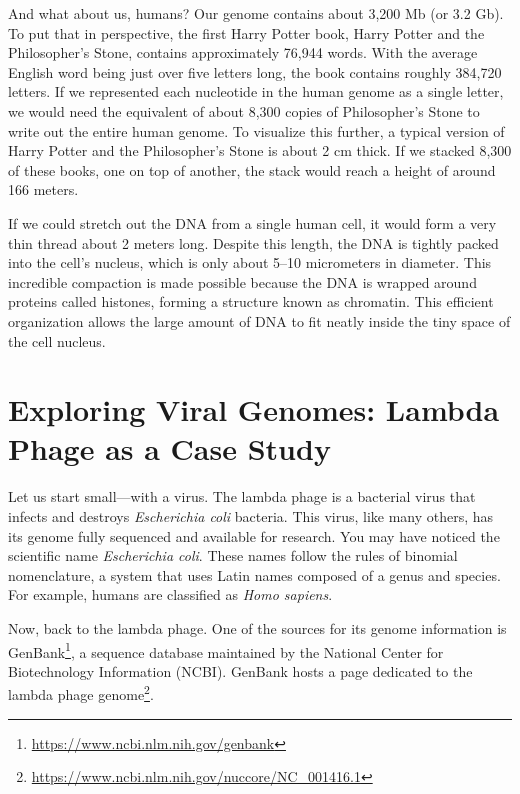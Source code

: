And what about us, humans? Our genome contains about 3,200 Mb (or 3.2 Gb). To put that in perspective, the first Harry Potter book, Harry Potter and the Philosopher’s Stone, contains approximately 76,944 words. With the average English word being just over five letters long, the book contains roughly 384,720 letters. If we represented each nucleotide in the human genome as a single letter, we would need the equivalent of about 8,300 copies of Philosopher’s Stone to write out the entire human genome. To visualize this further, a typical version of Harry Potter and the Philosopher’s Stone is about 2 cm thick. If we stacked 8,300 of these books, one on top of another, the stack would reach a height of around 166 meters.

If we could stretch out the DNA from a single human cell, it would form a very thin thread about 2 meters long. Despite this length, the DNA is tightly packed into the cell's nucleus, which is only about 5–10 micrometers in diameter. This incredible compaction is made possible because the DNA is wrapped around proteins called histones, forming a structure known as chromatin. This efficient organization allows the large amount of DNA to fit neatly inside the tiny space of the cell nucleus.

\section{Exploring Viral Genomes: Lambda Phage as a Case Study}

Let us start small—with a virus. The lambda phage is a bacterial virus that infects and destroys \textit{Escherichia coli} bacteria. This virus, like many others, has its genome fully sequenced and available for research. You may have noticed the scientific name \textit{Escherichia coli}. These names follow the rules of binomial nomenclature, a system that uses Latin names composed of a genus and species. For example, humans are classified as \textit{Homo sapiens}.

Now, back to the lambda phage. One of the sources for its genome information is GenBank\footnote{\url{https://www.ncbi.nlm.nih.gov/genbank}},
a sequence database maintained by the National Center for Biotechnology Information (NCBI). GenBank hosts a page dedicated to the lambda phage genome\footnote{\url{https://www.ncbi.nlm.nih.gov/nuccore/NC_001416.1}}.

